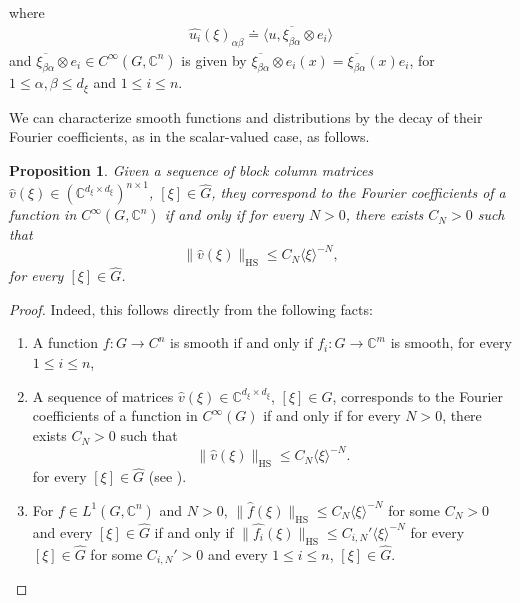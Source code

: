 \documentclass[11pt]{amsart}
\numberwithin{theorem}{section}
\numberwithin{equation}{section}
\newtheorem{prop}[theorem]{Proposition}
\theoremstyle{definition}
\numberwithin{example}{section}
\theoremstyle{definition}
\theoremstyle{definition}
\newcommand{\C}{\mathbb{C}}
\newcommand{\HS}{\operatorname{HS}}
\begin{document}
 where 
 \begin{align*}
     \widehat{u_i}(\xi)_{\alpha\beta}\doteq\langle u,\overline{\xi_{\beta\alpha}}\otimes e_i\rangle
 \end{align*}
  and $\overline{\xi_{\beta\alpha}}\otimes e_i\in C^\infty(G,\C^n)$ is given by $\overline{\xi_{\beta\alpha}}\otimes e_i(x) = \overline{\xi_{\beta\alpha}}(x)e_i$, for $1\leq \alpha,\beta\leq d_\xi$ and  $1\leq i\leq n$. 
  
  We can characterize smooth functions and distributions by the decay of their Fourier coefficients, as in the scalar-valued case, as follows.
\begin{prop}\label{prop_fourier_smooth}
    Given a sequence of block column matrices $\widehat{v}(\xi)\in(\mathbb{C}^{d_\xi\times d_\xi})^{n\times 1}$, $[\xi]\in\widehat{G}$, they correspond to the Fourier coefficients of a function in $C^\infty(G,\C^n)$ if and only if for every $N>0$, there exists $C_N>0$ such that 
    \begin{equation*}
        \|\widehat{v}(\xi)\|_{\HS}\leq C_N\langle \xi\rangle^{-N},
    \end{equation*}
     for every $[\xi]\in\widehat{G}$.
\end{prop}
\begin{proof}
    Indeed, this follows directly from the following facts: 
    \begin{enumerate}
        \item A function $f:G\to C^n$ is smooth if and only if $f_i:G\to \C^m$ is smooth, for every $1\leq i\leq n$,
        \item A sequence of matrices $\widehat{v}(\xi)\in \mathbb{C}^{d_\xi\times d_\xi}$, $[\xi]\in\widehat{G}$, corresponds to the Fourier coefficients of a function in $C^\infty(G)$ if and only if for every $N>0$, there exists $C_N>0$ such that 
    \begin{equation*}
        \|\widehat{v}(\xi)\|_{\HS}\leq C_N\langle \xi\rangle^{-N}.
    \end{equation*}
     for every $[\xi]\in\widehat{G}$ (see \cite{Ruz}).
        \item For $f\in L^1(G,\C^n)$ and $N>0$, $\|\widehat{f}(\xi)\|_{\HS}\leq C_N\langle \xi\rangle^{-N}$ for some $C_N>0$ and every $[\xi]\in\widehat{G}$ if and only if $\|\widehat{f_i}(\xi)\|_{\HS}\leq C_{i,N}'\langle \xi\rangle^{-N}$ for every $[\xi]\in\widehat{G}$ for some $C_{i,N}'>0$ and every $1\leq i\leq n$,  $[\xi]\in\widehat{G}$.
        \end{enumerate}
\end{proof}
\end{document}
